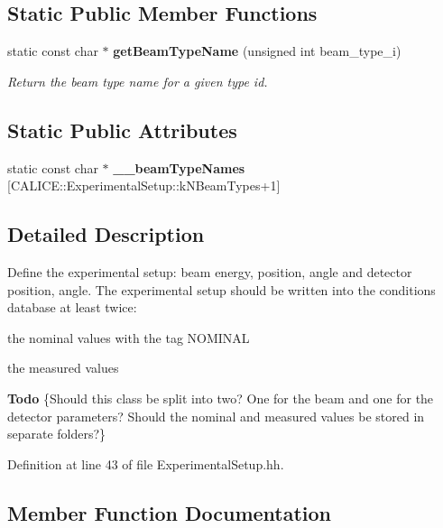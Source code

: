 \subsection*{Static Public Member Functions}
\begin{DoxyCompactItemize}
\item 
static const char $\ast$ {\bf getBeamTypeName} (unsigned int beam\_\-type\_\-i)\label{classCALICE_1_1ExperimentalSetup_a2fe50b694e5828226cf432403bf4a9a2}

\begin{DoxyCompactList}\small\item\em Return the beam type name for a given type id. \item\end{DoxyCompactList}\end{DoxyCompactItemize}
\subsection*{Static Public Attributes}
\begin{DoxyCompactItemize}
\item 
static const char $\ast$ {\bfseries \_\-\_\-beamTypeNames} [CALICE::ExperimentalSetup::kNBeamTypes+1]
\end{DoxyCompactItemize}


\subsection{Detailed Description}
Define the experimental setup: beam energy, position, angle and detector position, angle. The experimental setup should be written into the conditions database at least twice: 
\begin{DoxyItemize}
\item the nominal values with the tag NOMINAL 
\item the measured values 
\end{DoxyItemize}\begin{Desc}
\item[{\bf Todo}]\{Should this class be split into two? One for the beam and one for the detector parameters? Should the nominal and measured values be stored in separate folders?\} \end{Desc}


Definition at line 43 of file ExperimentalSetup.hh.

\subsection{Member Function Documentation}

